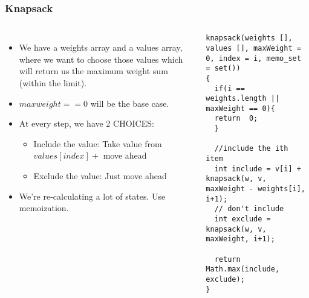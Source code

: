 \begin{frame}[fragile]
	\frametitle{Knapsack}
	
	\begin{columns}[T]
			\begin{itemize}
				\item We have a weights array and a values array, where we want to choose those values which will return us 
the maximum weight sum (within the limit). 
				\item $max weight == 0$ will be the base case. 				
\item At every step, we have 2 
CHOICES:
			\begin{itemize}
				\item Include the value: Take value from $values[index] +$ move ahead 
				\item Exclude the value: Just move ahead 
			\end{itemize}
			\item We’re re-calculating a lot of states. Use memoization.
			\end{itemize}
\begin{lstlisting}
knapsack(weights [], values [], maxWeight = 0, index = i, memo_set = set()) 
{ 
  if(i ==  weights.length || maxWeight == 0){ 
  return  0; 
  } 
 
  //include the ith item 
  int include = v[i] + knapsack(w, v, maxWeight - weights[i], i+1); 
  // don't include 
  int exclude =  knapsack(w, v, maxWeight, i+1); 
 
  return Math.max(include, exclude); 
} 
\end{lstlisting}			
		
		
	\end{columns}		
\end{frame}

